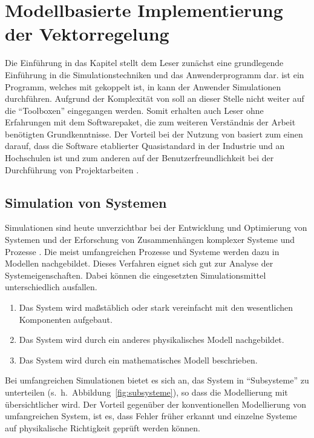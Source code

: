 
\chapter{Modellbasierte Implementierung der Vektorregelung}
\label{cha:regelungpmsm}

Die Einführung in das Kapitel stellt dem Leser zunächst eine grundlegende Einführung in die Simulationstechniken und das Anwenderprogramm  dar.
 ist ein Programm, welches mit  gekoppelt ist, in  kann der Anwender Simulationen durchführen.
Aufgrund der Komplexität von  soll an dieser Stelle nicht weiter auf die \enquote{Toolboxen} eingegangen werden.
Somit erhalten auch Leser ohne Erfahrungen mit dem Softwarepaket, die zum weiteren Verständnis der Arbeit benötigten Grundkenntnisse.
Der Vorteil bei der Nutzung von  basiert zum einen darauf, dass die Software etablierter Quasistandard in der Industrie und an Hochschulen ist und zum anderen auf der Benutzerfreundlichkeit bei der Durchführung von Projektarbeiten \autocite{scherf2010}.

\section{Simulation von Systemen}\label{sec:simulation}

Simulationen sind heute unverzichtbar bei der Entwicklung und Optimierung von Systemen und der Erforschung von Zusammenhängen komplexer Systeme und Prozesse \autocite{brychta}.
Die meist umfangreichen Prozesse und Systeme werden dazu in Modellen nachgebildet.
Dieses Verfahren eignet sich gut zur Analyse der Systemeigenschaften.
Dabei können die eingesetzten Simulationsmittel unterschiedlich ausfallen.

\begin{enumerate}
	\item Das System wird maßstäblich oder stark vereinfacht mit den wesentlichen Komponenten aufgebaut.
	\item Das System wird durch ein anderes physikalisches Modell nachgebildet.
	\item Das System wird durch ein mathematisches Modell beschrieben.
\end{enumerate}

Bei umfangreichen Simulationen bietet es sich an, das System in \enquote{Subsysteme} zu unterteilen (s.~h.~Abbildung~\ref{fig:subsysteme}), so dass die Modellierung mit  übersichtlicher wird.
Der Vorteil gegenüber der konventionellen Modellierung von umfangreichen System, ist es, dass Fehler früher erkannt und einzelne Systeme auf physikalische Richtigkeit geprüft werden können.

